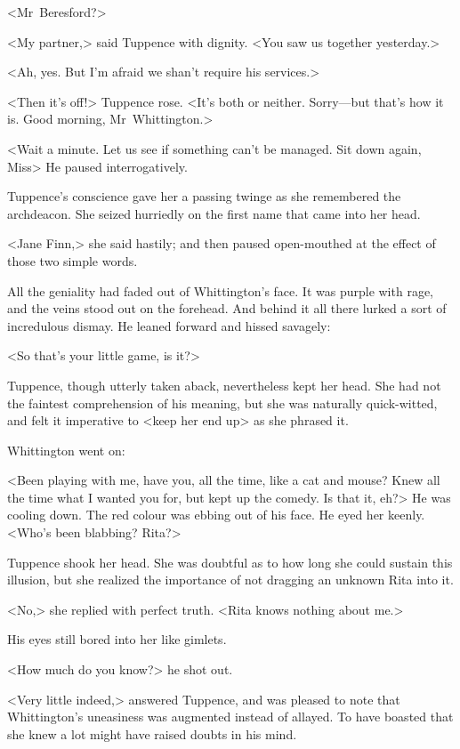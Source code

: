 <Mr~Beresford?>

<My partner,> said Tuppence with dignity. <You saw us together yesterday.>

<Ah, yes. But I'm afraid we shan't require his services.>

<Then it's off!> Tuppence rose. <It's both or neither. Sorry—but that's how it is. Good morning, Mr~Whittington.>

<Wait a minute. Let us see if something can't be managed. Sit down again, Miss\longdash> He paused interrogatively.

Tuppence's conscience gave her a passing twinge as she remembered the archdeacon. She seized hurriedly on the first name that came into her head.

<Jane Finn,> she said hastily; and then paused open-mouthed at the effect of those two simple words.

All the geniality had faded out of Whittington's face. It was purple with rage, and the veins stood out on the forehead. And behind it all there lurked a sort of incredulous dismay. He leaned forward and hissed savagely:

<So that's your little game, is it?>

Tuppence, though utterly taken aback, nevertheless kept her head. She had not the faintest comprehension of his meaning, but she was naturally quick-witted, and felt it imperative to <keep her end up> as she phrased it.

Whittington went on:

<Been playing with me, have you, all the time, like a cat and mouse? Knew all the time what I wanted you for, but kept up the comedy. Is that it, eh?> He was cooling down. The red colour was ebbing out of his face. He eyed her keenly. <Who's been blabbing? Rita?>

Tuppence shook her head. She was doubtful as to how long she could sustain this illusion, but she realized the importance of not dragging an unknown Rita into it.

<No,> she replied with perfect truth. <Rita knows nothing about me.>

His eyes still bored into her like gimlets.

<How much do you know?> he shot out.

<Very little indeed,> answered Tuppence, and was pleased to note that Whittington's uneasiness was augmented instead of allayed. To have boasted that she knew a lot might have raised doubts in his mind.

